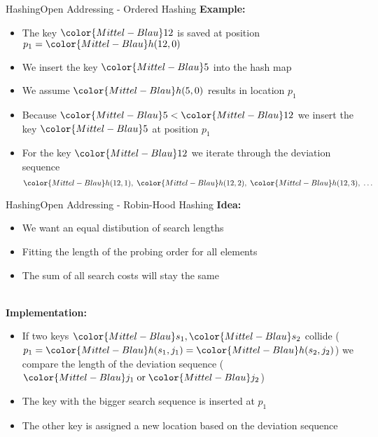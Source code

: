
\begin{frame}{Hashing}{Open Addressing - Ordered Hashing}
  \textbf{Example:}
  \begin{itemize}
    \item
      The key ${\color{Mittel-Blau}12}$ is saved at position
      $p_1 = {\color{Mittel-Blau}h(12, 0)}$
    \item
      We insert the key ${\color{Mittel-Blau}5}$ into the hash map
    \item
      We assume ${\color{Mittel-Blau}h(5,0)}$ results in location $p_1$
    \item
      Because ${\color{Mittel-Blau}5} < {\color{Mittel-Blau}12}$ we insert
      the key ${\color{Mittel-Blau}5}$ at position $p_1$
    \item
      For the key ${\color{Mittel-Blau}12}$ we iterate through the deviation
      sequence
      \begin{displaymath}
        {\color{Mittel-Blau}h(12, 1)} ,\;
        {\color{Mittel-Blau}h(12, 2)} ,\;
        {\color{Mittel-Blau}h(12, 3)} ,\;
        \dots
      \end{displaymath}
  \end{itemize}
\end{frame}


\begin{frame}{Hashing}{Open Addressing - Robin-Hood Hashing}
  \textbf{Idea:}
  \begin{itemize}
    \item
      We want an equal distibution of search lengths
    \item
      Fitting the length of the probing order for all elements
    \item
      The sum of all search costs will stay the same
  \end{itemize}
  \hfill\\[0.5em]
  \textbf{Implementation:}
  \begin{itemize}
    \item
      If two keys ${\color{Mittel-Blau}s_1}, {\color{Mittel-Blau}s_2}$ collide
      (\begin{math}
        p_1 = {\color{Mittel-Blau}h(s_1, j_1)}
            = {\color{Mittel-Blau}h(s_2, j_2)}
      \end{math})
      we compare the length of the deviation sequence
      (\begin{math}
        {\color{Mittel-Blau}j_1} \;\text{or}\; {\color{Mittel-Blau}j_2}
      \end{math})
    \item
      The key with the bigger search sequence is inserted at $p_1$
    \item
      The other key is assigned a new location based on the deviation sequence
  \end{itemize}
\end{frame}

